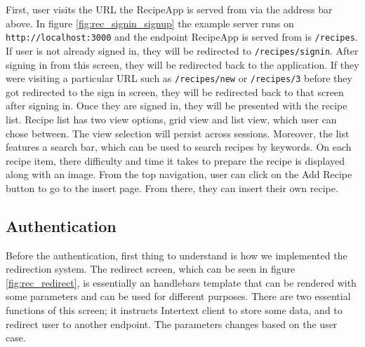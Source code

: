 First, user visits the URL the RecipeApp is served from via the address bar above. In figure \ref{fig:rec_signin_signup} the example server runs on \texttt{http://localhost:3000} and the endpoint RecipeApp is served from is \texttt{/recipes}. If user is not already signed in, they will be redirected to \texttt{/recipes/signin}. After signing in from this screen, they will be redirected back to the application. If they were visiting a particular URL such as \texttt{/recipes/new} or \texttt{/recipes/3} before they got redirected to the sign in screen, they will be redirected back to that screen after signing in. Once they are signed in, they will be presented with the recipe list. Recipe list has two view options, grid view and list view, which user can chose between. The view selection will persist across sessions. Moreover, the list features a search bar, which can be used to search recipes by keywords. On each recipe item, there difficulty and time it takes to prepare the recipe is displayed along with an image. From the top navigation, user can click on the Add Recipe button to go to the insert page. From there, they can insert their own recipe.

\subsection{Authentication}

Before the authentication, first thing to understand is how we implemented the redirection system. The redirect screen, which can be seen in figure \ref{fig:rec_redirect}, is essentially an handlebars template that can be rendered with some parameters and can be used for different purposes. There are two essential functions of this screen; it instructs Intertext client to store some data, and to redirect user to another endpoint. The parameters changes based on the user case.

